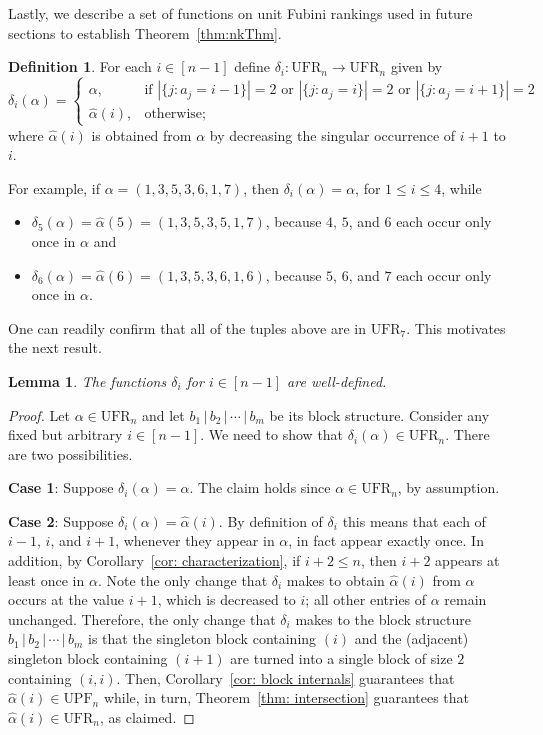 \documentclass[11pt,reqno]{amsart}
\newtheorem{lemma}{Lemma}[section]
\theoremstyle{definition}
\newtheorem{definition}{Definition}[section]
\theoremstyle{notation}
\theoremstyle{openproblem}
\newcommand{\upf}[1]{\text{UPF}_{#1}}
\newcommand{\UFR}[1]{\text{UFR}_{#1}}
\begin{document}
Lastly, we describe a set of functions on unit Fubini rankings used in future sections to establish Theorem~\ref{thm:nkThm}. 
\begin{definition}
\label{def: delta}
For each $i\in[n-1]$ define $\delta_i: \UFR{n}\to\UFR{n}$ given by
\begin{equation}
\label{eq: delta}
    \delta_i(\alpha) =
    \begin{cases}
        \alpha, & \text{if } |\{j : a_j = i-1\}| = 2 \text{ or } |\{j : a_j = i\}| = 2 \text{ or }|\{j : a_j = i+1\}| = 2\\
        \widehat{\alpha}(i), & \text{otherwise;}
    \end{cases}
\end{equation}
where $\widehat{\alpha}(i)$ is obtained from $\alpha$ by decreasing the singular occurrence of $i+1$ to $i$.
\end{definition}
For example, if $\alpha=(1,3,5,3,6,1,7)$, then $\delta_i(\alpha) = \alpha$, for $1\leq i\leq 4$, while
\begin{itemize}
    \item $\delta_5(\alpha)=\widehat{\alpha}(5)=(1,3,5,3,5,1,7)$, because $4$, $5$, and $6$ each occur only once in $\alpha$ and
    \item $\delta_6(\alpha)=\widehat{\alpha}(6)=(1,3,5,3,6,1,6)$, because $5$, $6$, and $7$ each occur only once in $\alpha$.
\end{itemize}
One can readily confirm that all of the tuples above are in $\UFR{7}$.
This motivates the next result.
\begin{lemma}
The functions $\delta_i$ for $i \in [n-1]$ are well-defined.
\end{lemma}

\begin{proof}
Let $\alpha \in \UFR{n}$ and let $b_1 \,|\, b_2 \,|\, \cdots \,|\,b_m$ be its block structure.
Consider any fixed but arbitrary $i\in[n-1]$.
We need to show that $\delta_i(\alpha) \in \UFR{n}$.
There are two possibilities.

\noindent\textbf{Case 1}: 
Suppose $\delta_i(\alpha) = \alpha$.
The claim holds since $\alpha \in \UFR{n}$, by assumption.

\noindent\textbf{Case 2}: 
Suppose $\delta_i(\alpha) = \widehat{\alpha}(i)$. 
By definition of $\delta_i$ this means that each of $i-1$, $i$, and $i+1$, whenever they appear in $\alpha$, in fact appear exactly once.
In addition, by Corollary~\ref{cor: characterization}, if $i+2\leq n$, then $i+2$ appears at least once in $\alpha$. 
Note the only change that $\delta_i$ makes to obtain $\widehat{\alpha}(i)$ from $\alpha$ occurs at the value $i+1$, which is decreased to $i$; all other entries of $\alpha$ remain unchanged.
Therefore, the only change that $\delta_i$ makes to the block structure $b_1 \,|\, b_2 \,|\, \cdots \,|\,b_m$ is that the singleton block containing $(i)$ and the (adjacent) singleton block containing $(i+1)$ are turned into a single block of size $2$ containing $(i,i)$.
Then, Corollary~\ref{cor: block internals} guarantees that $\widehat{\alpha}(i)\in\upf{n}$ while, in turn, Theorem~\ref{thm: intersection} guarantees that $\widehat{\alpha}(i)\in\UFR{n}$, as claimed.
\end{proof}
\end{document}
